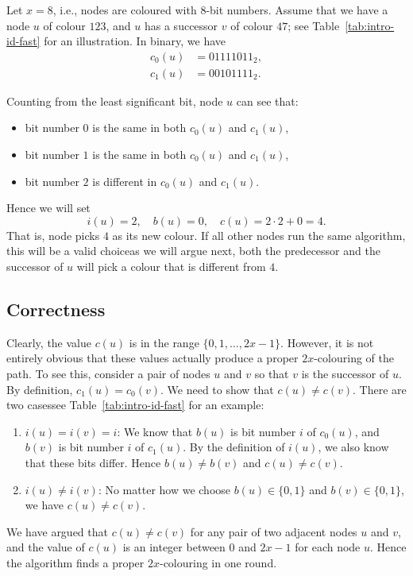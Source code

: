 Let $x = 8$, i.e., nodes are coloured with $8$-bit numbers. Assume that we have a node $u$ of colour $123$, and $u$ has a successor $v$ of colour $47$; see Table~\ref{tab:intro-id-fast} for an illustration. In binary, we have
\begin{align*}
    c_0(u) &= 01111011_2, \\
    c_1(u) &= 00101111_2.
\end{align*}
\begin{samepage}
Counting from the least significant bit, node $u$ can see that:
\begin{itemize}[noitemsep]
    \item bit number $0$ is the same in both $c_0(u)$ and $c_1(u)$,
    \item bit number $1$ is the same in both $c_0(u)$ and $c_1(u)$,
    \item bit number $2$ is different in $c_0(u)$ and $c_1(u)$.
\end{itemize}
\end{samepage}
Hence we will set
\[
    i(u) = 2, \quad
    b(u) = 0, \quad
    c(u) = 2\cdot2 + 0 = 4.
\]
That is, node picks $4$ as its new colour. If all other nodes run the same algorithm, this will be a valid choice\mydash as we will argue next, both the predecessor and the successor of $u$ will pick a colour that is different from $4$.


\subsection{Correctness}

Clearly, the value $c(u)$ is in the range $\{0,1,\dotsc,2x-1\}$. However, it is not entirely obvious that these values actually produce a proper $2x$-colouring of the path. To see this, consider a pair of nodes $u$ and $v$ so that $v$ is the successor of $u$. By definition, $c_1(u) = c_0(v)$. We need to show that $c(u) \ne c(v)$. There are two cases\mydash see Table~\ref{tab:intro-id-fast} for an example:
\begin{enumerate}
    \item $i(u) = i(v) = i$: We know that $b(u)$ is bit number $i$ of $c_0(u)$, and $b(v)$ is bit number $i$ of $c_1(u)$. By the definition of $i(u)$, we also know that these bits differ. Hence $b(u) \ne b(v)$ and $c(u) \ne c(v)$.
    \item $i(u) \ne i(v)$: No matter how we choose $b(u) \in \{0,1\}$ and $b(v) \in \{0,1\}$, we have $c(u) \ne c(v)$.
\end{enumerate}
We have argued that $c(u) \ne c(v)$ for any pair of two adjacent nodes $u$ and $v$, and the value of $c(u)$ is an integer between $0$ and $2x-1$ for each node $u$. Hence the algorithm finds a proper $2x$-colouring in one round.


